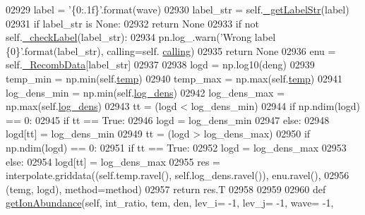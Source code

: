 \begin{DoxyCode}
{{{{{{{{{{{{{{{{{{{{{{02929             label = \textcolor{stringliteral}{'\{0:.1f\}'}.format(wave)
02930         label\_str = self.\hyperlink{classpyneb_1_1core_1_1pynebcore_1_1_rec_atom_ad235d43c967836595e501959f2c7c575}{\_getLabelStr}(label)
02931         \textcolor{keywordflow}{if} label\_str \textcolor{keywordflow}{is} \textcolor{keywordtype}{None}:
02932             \textcolor{keywordflow}{return} \textcolor{keywordtype}{None}
02933         \textcolor{keywordflow}{if} \textcolor{keywordflow}{not} self.\hyperlink{classpyneb_1_1core_1_1pynebcore_1_1_rec_atom_adcc9c72bd96e9064b01591d8b32112ea}{\_checkLabel}(label\_str):
02934             pn.log\_.warn(\textcolor{stringliteral}{'Wrong label \{0\}'}.format(label\_str), calling=self.
      \hyperlink{classpyneb_1_1core_1_1pynebcore_1_1_rec_atom_a82ec425ebba32b73a5d9ae52717d47c4}{calling})
02935             \textcolor{keywordflow}{return} \textcolor{keywordtype}{None}
02936         enu = self.\hyperlink{classpyneb_1_1core_1_1pynebcore_1_1_rec_atom_a1f483d9d99af479ef137489ccefe35e9}{\_RecombData}[label\_str]
02937             
02938         logd = np.log10(deng)
02939         temp\_min = np.min(self.\hyperlink{classpyneb_1_1core_1_1pynebcore_1_1_rec_atom_afdcfb955b81391dabcb298fe4990e33c}{temp})
02940         temp\_max = np.max(self.\hyperlink{classpyneb_1_1core_1_1pynebcore_1_1_rec_atom_afdcfb955b81391dabcb298fe4990e33c}{temp})
02941         log\_dens\_min = np.min(self.\hyperlink{classpyneb_1_1core_1_1pynebcore_1_1_rec_atom_ac93e76934d279878d4f1f6d961df5488}{log\_dens})
02942         log\_dens\_max = np.max(self.\hyperlink{classpyneb_1_1core_1_1pynebcore_1_1_rec_atom_ac93e76934d279878d4f1f6d961df5488}{log\_dens})
02943         tt = (logd < log\_dens\_min)
02944         \textcolor{keywordflow}{if} np.ndim(logd) == 0: 
02945             \textcolor{keywordflow}{if} tt == \textcolor{keyword}{True}:
02946                 logd = log\_dens\_min
02947         \textcolor{keywordflow}{else}:
02948             logd[tt] = log\_dens\_min
02949         tt = (logd > log\_dens\_max)
02950         \textcolor{keywordflow}{if} np.ndim(logd) == 0:
02951             \textcolor{keywordflow}{if} tt == \textcolor{keyword}{True}:
02952                 logd = log\_dens\_max
02953         \textcolor{keywordflow}{else}:
02954             logd[tt] = log\_dens\_max
02955         res = interpolate.griddata((self.temp.ravel(), self.log\_dens.ravel()), enu.ravel(),
02956                                    (temg, logd), method=method)
02957         \textcolor{keywordflow}{return} res.T
02958 
02959 
02960     \textcolor{keyword}{def }\hyperlink{classpyneb_1_1core_1_1pynebcore_1_1_rec_atom_a250ec6b99eedd84bdb8eae97cbd4beef}{getIonAbundance}(self, int\_ratio, tem, den, lev\_i= -1, lev\_j= -1, wave= -1, 
}}}}}}}}}}}}}}}}}}}}}}
\end{DoxyCode}
